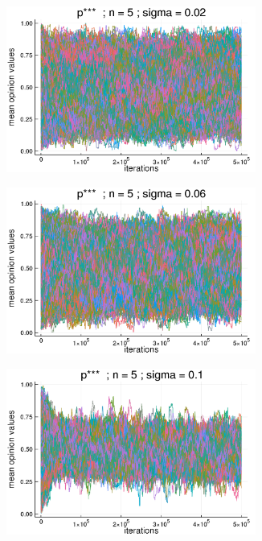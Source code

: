 \documentclass{article}
\begin{document}
    
    \begin{figure}[H]
      \centering
      \begin{subfigure}[b]{0.45\textwidth}
      \includegraphics[width=0.9\textwidth]{img/compare-ps/Poodlcalculatep***n5-rho01118033988749895-sigma002-00intrans.png}
    \end{subfigure}
    \begin{subfigure}[b]{0.45\textwidth}
      \includegraphics[width=0.9\textwidth]{img/compare-ps/Poodlcalculatep***n5-rho01118033988749895-sigma006-00intrans.png}
    \end{subfigure}
      \begin{subfigure}[b]{0.5\textwidth}
      \includegraphics[width=0.9\textwidth]{img/compare-ps/Poodlcalculatep***n5-rho01118033988749895-sigma01-00intrans.png}
      \end{subfigure}


\end{figure}
\end{document}
